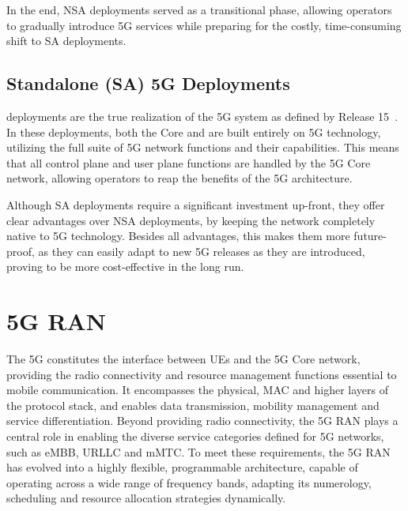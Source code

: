 In the end, \gls{NSA} deployments served as a transitional phase, allowing operators to gradually introduce 5G services while preparing for the costly, time-consuming shift to \gls{SA} deployments.
\subsection{Standalone (SA) 5G Deployments}
\label{sec:sa_deployments}
 deployments are the true realization of the 5G system as defined by  Release 15~\cite{3GPPRelease15}. In these deployments, both the Core and  are built entirely on 5G technology, utilizing the full suite of 5G network functions and their capabilities. This means that all control plane and user plane functions are handled by the 5G Core network, allowing operators to reap the benefits of the 5G architecture.

Although \gls{SA} deployments require a significant investment up-front, they offer clear advantages over \gls{NSA} deployments, by keeping the network completely native to 5G technology. Besides all advantages, this makes them more future-proof, as they can easily adapt to new 5G releases as they are introduced, proving to be more cost-effective in the long run.

\pagebreak
\section{5G RAN}
\label{sec:5g_ran}
The 5G  constitutes the interface between \glspl{UE} and the 5G Core network, providing the radio connectivity and resource management functions essential to mobile communication. It encompasses the physical, MAC and higher layers of the protocol stack, and enables data transmission, mobility management and service differentiation. Beyond providing radio connectivity, the 5G \gls{RAN} plays a central role in enabling the diverse service categories defined for 5G networks, such as \gls{eMBB}, \gls{URLLC} and \gls{mMTC}. To meet these requirements, the 5G \gls{RAN} has evolved into a highly flexible, programmable architecture, capable of operating across a wide range of frequency bands, adapting its numerology, scheduling and resource allocation strategies dynamically.

